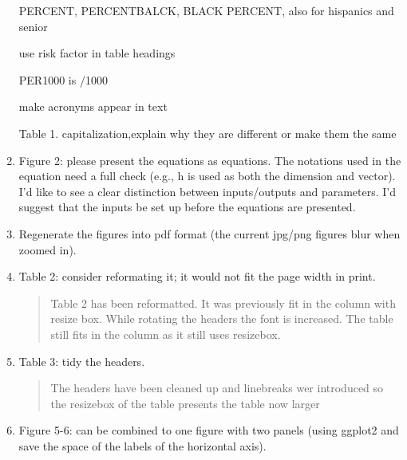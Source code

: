 \begin{enumerate}
\DOIT PERCENT, PERCENTBALCK, BLACK PERCENT, also for hispanics and senior

\DOIT use risk factor in table headings

\DOIT PER1000 is /1000

\DOIT make acronyms appear in text

\DOIT Table 1. capitalization,explain why they are different or make them the same


\item \DOIT  Figure 2: please present the equations as equations. The notations used in the equation need a full check (e.g., h is used as both the dimension and vector). I'd like to see a clear distinction between inputs/outputs and parameters. I'd suggest that the inputs be set up before the equations are presented.

\begin{quote}
\end{quote}

\item \DOIT  Regenerate the figures into pdf format (the current jpg/png figures blur when zoomed in).

\begin{quote}
\end{quote}

\item \DONE  Table 2: consider reformating it; it would not fit the page width in print.

\begin{quote}
Table 2 has been reformatted. It was previously fit in the column with resize box. While rotating the headers the font is increased. The table still fits in the column as it still uses resizebox.
\end{quote}


\item \DONE  Table 3: tidy the headers.

\begin{quote}
    The headers have been cleaned up and linebreaks wer introduced so the resizebox of the table presents the table now larger
\end{quote}

\item \DOIT  Figure 5-6: can be combined to one figure with two panels (using ggplot2 and save the space of the labels of the horizontal axis).

\begin{quote}
\end{quote}


\end{enumerate}
